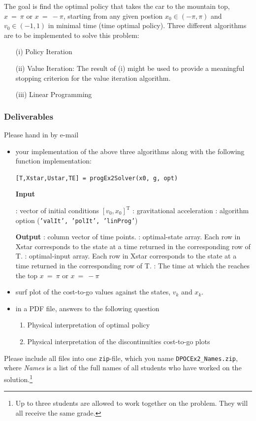 \documentclass[uebung]{ETHIDSCprogramming_dpoc}
\begin{document}
The goal is find the optimal policy that takes the car to the mountain top, $x\ =\ \pi $ or  $x\ =\ -\pi $, starting from any given postion $x_0 \in (-\pi,\pi)$ and $v_0 \in (-1,1)$ in minimal time (time optimal policy). Three different algorithms are to be implemented to solve this problem:
\begin{itemize}
	\item[(i)] Policy Iteration
	\item[(ii)] Value Iteration: The result of (i) might be used to provide a meaningful stopping criterion for the value iteration algorithm. 
	\item[(iii)] Linear Programming
\end{itemize}

\subsubsection*{Deliverables}
Please hand in by e-mail
\begin{itemize}
\item your implementation of the above three algorithms along with the following function implementation:
 
{\tt [T,Xstar,Ustar,TE] = progEx2Solver(x0, g, opt)} 

\textbf{Input}

: vector of initial conditions $[v_0, x_0]^{\mathrm{T}}$
: gravitational acceleration
: algorithm option ({\tt 'valIt', 'polIt', 'linProg'})

\textbf{Output}
: column vector of time points.
: optimal-state array. Each row in Xstar corresponds to the state at a time returned in the corresponding row of T.
: optimal-input array. Each row in Xstar corresponds to the state at a time returned in the corresponding row of T.
: The time at which the reaches the top $x\ =\ \pi $ or  $x\ =\ -\pi $
\item surf plot of the cost-to-go values against the states, $v_k$ and $x_k$.
\item in a PDF file, answers to the following question
\begin{enumerate}
\item Physical interpretation of optimal policy
\item Physical interpretation of the discontinuities cost-to-go plots
\end{enumerate}
\end{itemize}
Please include all files into one {\tt zip}-file, which you name {\tt DPOCEx2\_Names.zip}, where {\it Names} is a list of the full names of all students who have worked on the solution.\footnote{Up to three students are allowed to work together on the problem.  They will all receive the same grade.}  
\smallskip 
\end{document}
